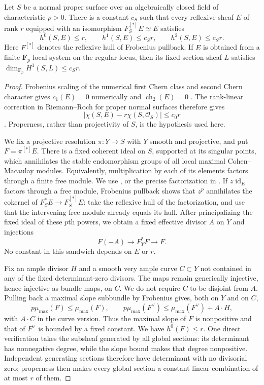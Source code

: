 \begin{theorem}
\label{D:unit-reflexive-linear-cohomology}
Let $S$ be a normal proper surface over an algebraically closed field of
characteristic $p>0$. There is a constant $c_S$ such that every reflexive
sheaf $E$ of rank $r$ equipped with an isomorphism
$F_S^{[*]}E\simeq E$ satisfies
\[
 h^0(S,E)\le r,\qquad h^1(S,E)\le c_Sr,\qquad
 h^2(S,E)\le c_Sr.
\]
Here $F^{[*]}$ denotes the reflexive hull of Frobenius pullback. If $E$
is obtained from a finite $\mathbf F_p$ local system on the regular
locus, then its fixed-section sheaf $L$ satisfies
$\dim_{\mathbf F_p}H^1(S,L)\le c_Sr$.
\end{theorem}
\begin{proof}
Frobenius scaling of the numerical first Chern class and second Chern
character gives $c_1(E)=0$ numerically and $\operatorname{ch}_2(E)=0$
\citep[Theorem 4.5(2)]{C_Langer2025}. The rank-linear correction in
Riemann--Roch for proper normal surfaces therefore gives
\[
 |\chi(S,E)-r\chi(S,\mathcal O_S)|\le c_0r
\]
\citep[Theorem 0.1]{C_Langer2026}. Properness, rather than projectivity
of $S$, is the hypothesis used here.

We fix a projective resolution $\pi:Y\to S$ with $Y$ smooth and
projective, and put $F=\pi^{[*]}E$. There is a fixed coherent ideal on
$S$, supported at its singular points, which annihilates the stable
endomorphism groups of all local maximal Cohen--Macaulay modules.
Equivalently, multiplication by each of its elements factors through a
finite free module. We use
\citet[Theorem 1.1 and Remark 2.5]{C_Kimura2025}, or the precise
factorization in \citet[Lemma 1.8]{C_Langer2026}.
If $z\operatorname{id}_E$ factors through a free module, Frobenius
pullback shows that $z^p$ annihilates the cokernel of
$F_S^*E\to F_S^{[*]}E$: take the reflexive hull of the factorization,
and use that the intervening free module already equals its hull.
After principalizing the fixed ideal of these $p$th powers, we obtain
a fixed effective divisor $A$ on $Y$ and injections
\[
 F(-A)\longrightarrow F_Y^*F\longrightarrow F.
\]
No constant in this sandwich depends on $E$ or $r$.

Fix an ample divisor $H$ and a smooth very ample curve $C\subset Y$
not contained in any of the fixed determinant-zero divisors. The maps
remain generically injective, hence injective as bundle maps, on $C$.
We do not require $C$ to be disjoint from $A$. Pulling back a maximal
slope subbundle by Frobenius gives, both on $Y$ and on $C$,
\[
 p\mu_{\max}(F)\le\mu_{\max}(F),\qquad
 p\mu_{\max}(F^\vee)\le\mu_{\max}(F^\vee)+A\cdot H,
\]
with $A\cdot C$ in the curve version. Thus the maximal slope of $F$
is nonpositive and that of $F^\vee$ is bounded by a fixed constant.
We have $h^0(F)\le r$. One direct verification takes the subsheaf
generated by all global sections: its determinant has nonnegative
degree, while the slope bound makes that degree nonpositive. Independent
generating sections therefore have determinant with no divisorial zero;
properness then makes every global section a constant linear combination
of at most $r$ of them.


\end{proof}
